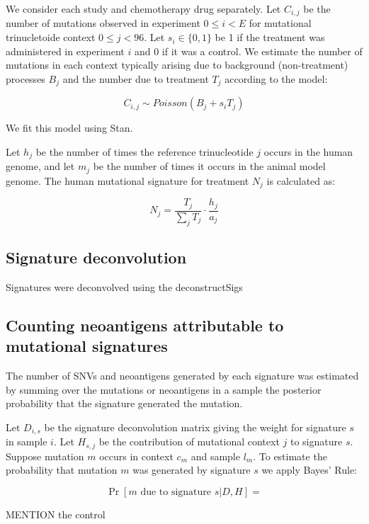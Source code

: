 We consider each study and chemotherapy drug separately. Let $C_{i,j}$ be the number of mutations observed in experiment $0 \leq i \lt E$ for mutational trinucletoide context $0 \leq j \lt 96$. Let $s_i \in \{0,1\}$ be 1 if the treatment was administered in experiment $i$ and 0 if it was a control. We estimate the number of mutations in each context typically arising due to background (non-treatment) processes $B_j$ and the number due to treatment $T_j$ according to the model:

\[
C_{i,j} \sim \mathit{Poisson}(B_j + s_i T_j)
\]

We fit this model using Stan\cite{Gelman_2015}.

Let $h_j$ be the number of times the reference trinucleotide $j$ occurs in the human genome, and let $m_j$ be the number of times it occurs in the animal model genome. The human mutational signature for treatment $N_j$ is calculated as:

\[
N_j = \frac{T_j}{\sum_j{T_j}} \cdot \frac{h_j}{a_j}
\]


\subsection*{Signature deconvolution}
Signatures were deconvolved using the deconstructSigs\cite{Rosenthal_2016}

\subsection*{Counting neoantigens attributable to mutational signatures}
The number of SNVs and neoantigens generated by each signature was estimated by summing over the mutations or neoantigens in a sample the posterior probability that the signature generated the mutation.

Let $D_{i,s}$ be the signature deconvolution matrix giving the weight for signature $s$ in sample $i$. Let $H_{s,j}$ be the contribution of mutational context $j$ to signature $s$. Suppose mutation $m$ occurs in context $c_m$ and sample $l_m$. To estimate the probability that mutation $m$ was generated by signature $s$ we apply Bayes' Rule:

\[

\Pr[\text{$m$ due to signature $s$} | D,H ] = 

\]


MENTION the control



